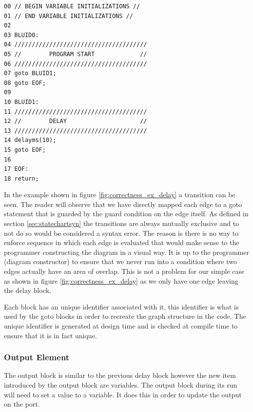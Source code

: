\begin{minipage}{\textwidth}
\begin{lstlisting}[frame=single]
00 // BEGIN VARIABLE INITIALIZATIONS //
01 // END VARIABLE INITIALIZATIONS //
02 
03 BLUID0:
04 //////////////////////////////////////
05 //        PROGRAM START             //
06 //////////////////////////////////////
07 goto BLUID1;
08 goto EOF;
09 
10 BLUID1:
11 //////////////////////////////////////
12 //        DELAY                     //
13 //////////////////////////////////////
14 delayms(10);
15 goto EOF;
16
17 EOF:
18 return;
\end{lstlisting}
\end{minipage}

In the example shown in figure \ref{fig:correctness_ex_delay} a transition can be seen. The reader will observe that we have directly mapped each edge to a goto statement that is guarded by the guard condition on the edge itself. As defined in section \ref{sec:statechartsyn} the transitions are always mutually exclusive and to not do so would be considered a syntax error. The reason is there is no way to enforce sequence in which each edge is evaluated that would make sense to the programmer constructing the diagram in a visual way. It is up to the programmer (diagram constructor) to ensure that we never run into a condition where two edges actually have an area of overlap. This is not a problem for our simple case as shown in figure \ref{fig:correctness_ex_delay} as we only have one edge leaving the delay block.

Each block has an unique identifier associated with it, this identifier is what is used by the goto blocks in order to recreate the graph structure in the code. The unique identifier is generated at design time and is checked at compile time to ensure that it is in fact unique.

\subsubsection{Output Element}

The output block is similar to the previous delay block however the new item introduced by the output block are variables. The output block during its run will need to set a value to a variable. It does this in order to update the output on the port. 

